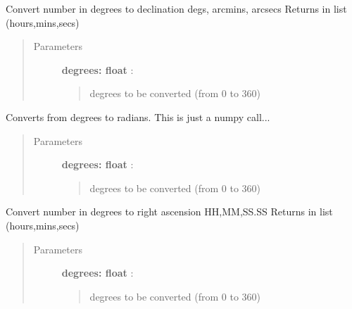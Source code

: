 \documentclass[letterpaper,10pt,english]{sphinxmanual}
\begin{document}

\begin{fulllineitems}
\label{index:astroCoords.deg2decdms}
Convert number in degrees to declination degs, arcmins, arcsecs
Returns in list (hours,mins,secs)
\begin{quote}\begin{description}
\item[{Parameters }] \leavevmode
\textbf{degrees: float} :
\begin{quote}

degrees to be converted (from 0 to 360)
\end{quote}

\end{description}\end{quote}

\end{fulllineitems}



\begin{fulllineitems}
\label{index:astroCoords.deg2rad}
Converts from degrees to radians.
This is just a numpy call...
\begin{quote}\begin{description}
\item[{Parameters }] \leavevmode
\textbf{degrees: float} :
\begin{quote}

degrees to be converted (from 0 to 360)
\end{quote}

\end{description}\end{quote}

\end{fulllineitems}



\begin{fulllineitems}
\label{index:astroCoords.deg2rahms}
Convert number in degrees to right ascension HH,MM,SS.SS
Returns in list (hours,mins,secs)
\begin{quote}\begin{description}
\item[{Parameters }] \leavevmode
\textbf{degrees: float} :
\begin{quote}

degrees to be converted (from 0 to 360)
\end{quote}

\end{description}\end{quote}

\end{fulllineitems}
\end{document}

